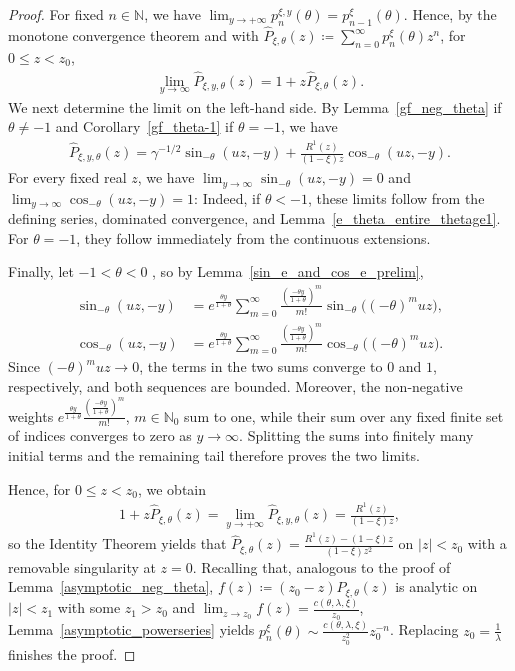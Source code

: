 \documentclass[10pt,a4paper]{amsart}
\newcommand{\N}{\mathbb{N}} %
\newcommand{\1}{\mathds{1}}
\begin{document}
\begin{proof}
For fixed $n\in\N$, we have $\lim_{y\to+\infty} p_n^{\xi,y}(\theta)= p_{n-1}^{\xi}(\theta)$. Hence, by the monotone convergence theorem and with $\hat P_{\xi,\theta}(z)\coloneqq \sum_{n=0}^\infty p_n^\xi(\theta) z^n$, for $0\leq z<z_0$,
\begin{align*}
    \lim_{y\to\infty}\hat P_{\xi,y,\theta}(z)=1+z\hat P_{\xi,\theta}(z).
\end{align*}
We next determine the limit on the left-hand side. By Lemma~\ref{gf_neg_theta} if $\theta\neq -1$ and Corollary~\ref{gf_theta-1} if $\theta=-1$, we have
\begin{align*}
    \hat P_{\xi,y,\theta}(z)=\gamma^{-1/2}\sin_{-\theta}(uz,-y)+\frac{R^1(z)}{(1-\xi)z}\cos_{-\theta}(uz,-y).
\end{align*}
For every fixed real $z$, we have $\lim_{y\to\infty}\sin_{-\theta}(uz,-y)=0$ and $\lim_{y\to\infty}\cos_{-\theta}(uz,-y)=1$:
Indeed, if $\theta<-1$, these limits follow from the defining series,
dominated convergence, and Lemma~\ref{e_theta_entire_thetage1}.
For $\theta=-1$, they follow immediately from the continuous
extensions.

Finally, let $-1<\theta<0$ , so by Lemma~\ref{sin_e_and_cos_e_prelim},
\begin{align*}
    \sin_{-\theta}(uz,-y)
    &=e^{\frac{\theta y}{1+\theta}}\sum_{m=0}^\infty\frac{\left(\frac{-\theta y}{1+\theta}\right)^m}{m!}\sin_{-\theta}\bigl((-\theta)^m uz\bigr),\\
    \cos_{-\theta}(uz,-y)
    &= e^{\frac{\theta y}{1+\theta}}\sum_{m=0}^\infty\frac{\left(\frac{-\theta y}{1+\theta}\right)^m}{m!}\cos_{-\theta}\bigl((-\theta)^m uz\bigr).
\end{align*}
Since $(-\theta)^m uz\to0$, the terms in the two sums converge to
$0$ and $1$, respectively, and both sequences are bounded. Moreover,
the non-negative weights $e^{\frac{\theta y}{1+\theta}}\frac{\left(\frac{-\theta y}{1+\theta}\right)^m}{m!}$, $m\in\N_0$ sum to one, while their sum over any fixed finite set of indices
converges to zero as $y\to\infty$. Splitting the sums into finitely
many initial terms and the remaining tail therefore proves the two
limits.

Hence, for $0\le z<z_0$, we obtain
\begin{align*}
    1+z\hat P_{\xi,\theta}(z)=\lim_{y\to+\infty}\hat P_{\xi,y,\theta}(z)=\frac{R^1(z)}{(1-\xi)z},
\end{align*}
so the Identity Theorem yields that $\hat P_{\xi,\theta}(z)=\frac{R^1(z)-(1-\xi)z}{(1-\xi)z^2}$ on $|z|<z_0$ with a removable singularity at $z=0$. Recalling that, analogous to the proof of Lemma~\ref{asymptotic_neg_theta}, $f(z)\coloneqq (z_0-z)\hat P_{\xi,\theta}(z)$ is analytic on $|z|<z_1$ with some $z_1>z_0$ and
$\lim_{z\to z_0}f(z)=\frac{c(\theta,\lambda,\xi)}{z_0}$, Lemma~\ref{asymptotic_powerseries} yields $ p_n^{\xi}(\theta)\sim \frac{c(\theta,\lambda,\xi)}{z_0^2}z_0^{-n}$.
   Replacing $z_0=\frac{1}{\lambda}$ finishes the proof.
\end{proof}
\end{document}

